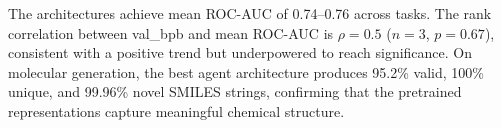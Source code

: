 The architectures achieve mean ROC-AUC of 0.74--0.76 across tasks. The rank correlation between val\_bpb and mean ROC-AUC is $\rho = 0.5$ ($n = 3$, $p = 0.67$), consistent with a positive trend but underpowered to reach significance. On molecular generation, the best agent architecture produces 95.2\% valid, 100\% unique, and 99.96\% novel SMILES strings, confirming that the pretrained representations capture meaningful chemical structure.
